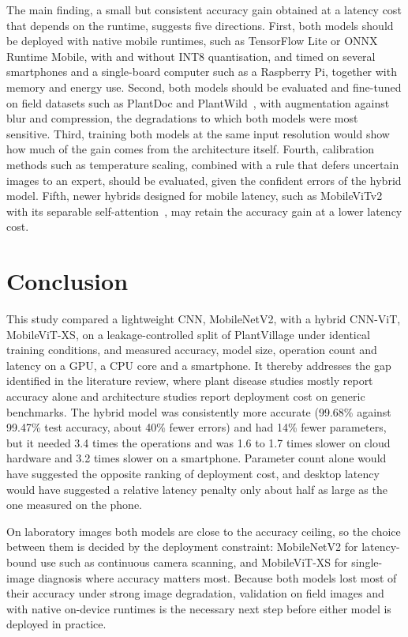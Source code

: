 \documentclass[conference]{IEEEtran}
\begin{document}
The main finding, a small but consistent accuracy gain obtained at a latency cost that depends on the runtime, suggests five directions. First, both models should be deployed with native mobile runtimes, such as TensorFlow Lite or ONNX Runtime Mobile, with and without INT8 quantisation, and timed on several smartphones and a single-board computer such as a Raspberry Pi, together with memory and energy use. Second, both models should be evaluated and fine-tuned on field datasets such as PlantDoc and PlantWild~\cite{kumar2025mobilefriendly}, with augmentation against blur and compression, the degradations to which both models were most sensitive. Third, training both models at the same input resolution would show how much of the gain comes from the architecture itself. Fourth, calibration methods such as temperature scaling, combined with a rule that defers uncertain images to an expert, should be evaluated, given the confident errors of the hybrid model. Fifth, newer hybrids designed for mobile latency, such as MobileViTv2 with its separable self-attention~\cite{mehta2022mobilevitv2}, may retain the accuracy gain at a lower latency cost.

\section{Conclusion}
\label{sec:conclusion}

This study compared a lightweight CNN, MobileNetV2, with a hybrid CNN-ViT, MobileViT-XS, on a leakage-controlled split of PlantVillage under identical training conditions, and measured accuracy, model size, operation count and latency on a GPU, a CPU core and a smartphone. It thereby addresses the gap identified in the literature review, where plant disease studies mostly report accuracy alone and architecture studies report deployment cost on generic benchmarks. The hybrid model was consistently more accurate (99.68\% against 99.47\% test accuracy, about 40\% fewer errors) and had 14\% fewer parameters, but it needed 3.4 times the operations and was 1.6 to 1.7 times slower on cloud hardware and 3.2 times slower on a smartphone. Parameter count alone would have suggested the opposite ranking of deployment cost, and desktop latency would have suggested a relative latency penalty only about half as large as the one measured on the phone.

On laboratory images both models are close to the accuracy ceiling, so the choice between them is decided by the deployment constraint: MobileNetV2 for latency-bound use such as continuous camera scanning, and MobileViT-XS for single-image diagnosis where accuracy matters most. Because both models lost most of their accuracy under strong image degradation, validation on field images and with native on-device runtimes is the necessary next step before either model is deployed in practice.

\medskip
\printbibliography
\end{document}
